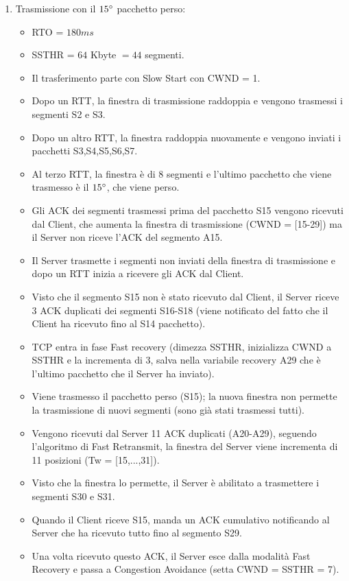 \documentclass[10pt,a4paper]{article}
\begin{document}
\begin{enumerate}
		\item Trasmissione con il $15 \degree$ pacchetto perso:
			\begin{itemize}
				\item RTO = $180 ms$
				\item SSTHR = $64$ Kbyte $= 44$ segmenti.
				\item Il trasferimento parte con Slow Start con CWND = 1.
				\item Dopo un RTT, la finestra di trasmissione raddoppia e vengono trasmessi i segmenti S2 e S3.
				\item Dopo un altro RTT, la finestra raddoppia nuovamente e vengono inviati i pacchetti S3,S4,S5,S6,S7.
				\item Al terzo RTT, la finestra è di 8 segmenti e l'ultimo pacchetto che viene trasmesso è il $15 \degree$, che viene perso.
				\item Gli ACK dei segmenti trasmessi prima del pacchetto S15 vengono ricevuti dal Client, che aumenta la finestra di trasmissione (CWND = [15-29]) ma il Server non riceve l'ACK del segmento A15.
				\item Il Server trasmette i segmenti non inviati della finestra di trasmissione e dopo un RTT inizia a ricevere gli ACK dal Client.
				\item Visto che il segmento S15 non è stato ricevuto dal Client, il Server riceve 3 ACK duplicati dei segmenti S16-S18 (viene notificato del fatto che il Client ha ricevuto fino al S14 pacchetto).
				\item TCP entra in fase Fast recovery (dimezza SSTHR, inizializza CWND a SSTHR e la incrementa di 3, salva nella variabile recovery A29 che è l'ultimo pacchetto che il Server ha inviato).
				\item Viene trasmesso il pacchetto perso (S15); la nuova finestra non permette la trasmissione di nuovi segmenti (sono già stati trasmessi tutti).
				\item Vengono ricevuti dal Server 11 ACK duplicati (A20-A29), seguendo l'algoritmo di Fast Retransmit, la finestra del Server viene incrementa di 11 posizioni (Tw = [15,...,31]).
				\item Visto che la finestra lo permette, il Server è abilitato a trasmettere i segmenti S30 e S31.
				\item Quando il Client riceve S15, manda un ACK cumulativo notificando al Server che ha ricevuto tutto fino al segmento S29.
				\item Una volta ricevuto questo ACK, il Server esce dalla modalità Fast Recovery e passa a Congestion Avoidance (setta CWND = SSTHR = 7).

\end{itemize}
\end{enumerate}
\end{document}

